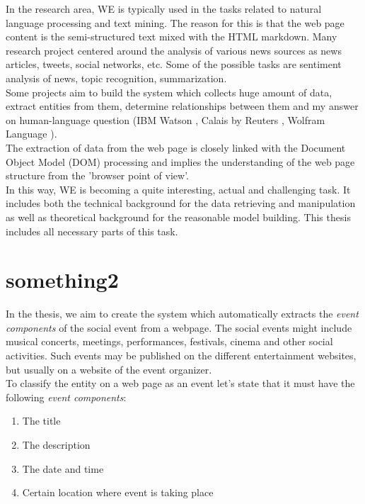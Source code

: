 In the research area, WE is typically used in the tasks related to natural language processing and text mining. The reason for this is that the web page content is the semi-structured text mixed with the HTML markdown. Many research project centered around the analysis of various news sources as news articles, tweets, social networks, etc. Some of the possible tasks are sentiment analysis of news, topic recognition, summarization. \\

Some projects aim to build the system which collects huge amount of data, extract entities from them, determine relationships between them and my answer on human-language question (IBM Watson \cite{IBMAlchemy}, Calais by Reuters \cite{Calais}, Wolfram Language \cite{Wolfram}).\\      

The extraction of data from the web page is closely linked with the Document Object Model (DOM) processing and implies the understanding of the web page structure from the 'browser point of view'. \\

In this way, WE is becoming a quite interesting, actual and challenging task. It includes both the technical background for the data retrieving and manipulation as well as theoretical background for the reasonable model building. This thesis includes all necessary parts of this task.

\section{something2}
In the thesis, we aim to create the system which automatically extracts the \textit{event components} of the social event from a webpage. The social events might include musical concerts, meetings, performances, festivals, cinema and other social activities. Such events may be published on the different entertainment websites, but usually on a website of the event organizer.\\

To classify the entity on a web page as an event let's state that it must have the following \textit{event components}:
\begin{enumerate}
    \item The title
    \item The description
    \item The date and time
    \item Certain location where event is taking place
\end{enumerate}

